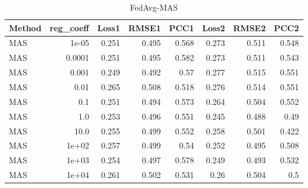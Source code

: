 \begin{table}
\caption{FedAvg-MAS}
\begin{tabular}{lrrrrrrr}
\toprule
Method & reg_coeff & Loss1 & RMSE1 & PCC1 & Loss2 & RMSE2 & PCC2 \\
\midrule
MAS & 1e-05 & 0.251 & 0.495 & 0.568 & 0.273 & 0.511 & 0.548 \\
MAS & 0.0001 & 0.251 & 0.495 & 0.582 & 0.273 & 0.511 & 0.543 \\
MAS & 0.001 & 0.249 & 0.492 & 0.57 & 0.277 & 0.515 & 0.551 \\
MAS & 0.01 & 0.265 & 0.508 & 0.518 & 0.276 & 0.514 & 0.551 \\
MAS & 0.1 & 0.251 & 0.494 & 0.573 & 0.264 & 0.504 & 0.552 \\
MAS & 1.0 & 0.253 & 0.496 & 0.551 & 0.245 & 0.488 & 0.49 \\
MAS & 10.0 & 0.255 & 0.499 & 0.552 & 0.258 & 0.501 & 0.422 \\
MAS & 1e+02 & 0.257 & 0.499 & 0.54 & 0.252 & 0.495 & 0.508 \\
MAS & 1e+03 & 0.254 & 0.497 & 0.578 & 0.249 & 0.493 & 0.532 \\
MAS & 1e+04 & 0.261 & 0.502 & 0.531 & 0.26 & 0.504 & 0.5 \\
\bottomrule
\end{tabular}
\end{table}
